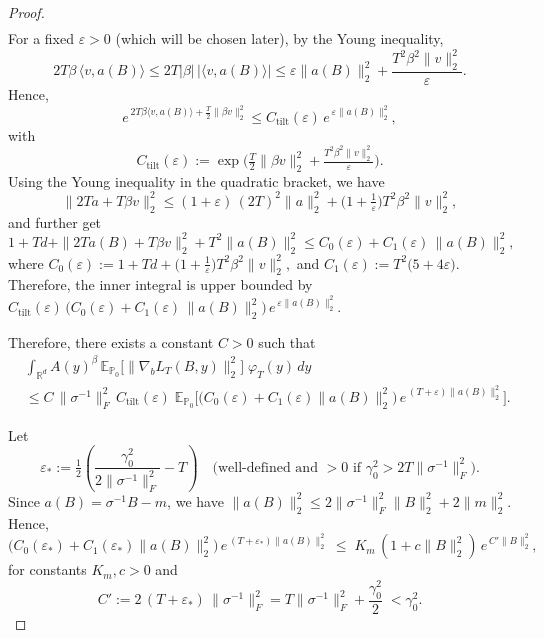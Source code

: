 \documentclass[10pt,a4paper]{amsart}
\newcommand{\E}{\mathbb{E}}
\newcommand{\R}{\mathbb{R}}
\begin{document}
\begin{proof}
\begin{align*}
\end{align*}
For a fixed $\varepsilon > 0$ (which will be chosen later), by the Young inequality, 
\[
2T\beta\,\langle v,a(B)\rangle
\leq
2T|\beta|\,|\langle v,a(B)\rangle|
\leq
\varepsilon\|a(B)\|_2^2
+
\frac{T^2\beta^2\|v\|_2^2}{\varepsilon}.
\]
Hence, 
\[
e^{\,2T\beta\langle v,a(B)\rangle+\frac{T}{2}\|\beta v\|_2^2}
\le C_{\mathrm{tilt}}(\varepsilon)\,e^{\,\varepsilon\|a(B)\|_2^2},
\]
with
\[
C_{\mathrm{tilt}}(\varepsilon):=\exp\!\Big(\tfrac{T}{2}\|\beta v\|_2^2+\tfrac{T^2\beta^2\|v\|_2^2}{\varepsilon}\Big).
\]
Using the Young inequality in the quadratic bracket, we have
\[
\|2Ta+T\beta v\|_2^2\le (1+\varepsilon)\,(2T)^2\|a\|_2^2+\Big(1+\tfrac1\varepsilon\Big)T^2\beta^2\|v\|_2^2,
\]
and further get
\[
1+Td+\|2Ta(B)+T\beta v\|_2^2+T^2\|a(B)\|_2^2
\le C_0(\varepsilon)+C_1(\varepsilon)\,\|a(B)\|_2^2,
\]where $C_0(\varepsilon):=1+Td+\Big(1+\tfrac{1}{\varepsilon}\Big)T^2\beta^2\|v\|_2^2,$ and $C_1(\varepsilon):=T^2\big(5+4\varepsilon\big).$
Therefore, the inner integral is upper bounded by
$C_{\mathrm{tilt}}(\varepsilon)\,\bigl(C_0(\varepsilon)+C_1(\varepsilon)\,\|a(B)\|_2^2\bigr)\,e^{\,\varepsilon\|a(B)\|_2^2}.$

Therefore, there exists a constant $C > 0$ such that
\begin{align*}
    &\int_{\R^d} A(y)^{\beta}\,\E_{\mathbb{P}_0}\big[\|\nabla_b L_T(B,y)\|_2^2\big]\;\varphi_T(y)\,dy \\
    &\leq C\,\|\sigma^{-1}\|_F^2\,C_{\mathrm{tilt}}(\varepsilon)\;
\E_{\mathbb{P}_0}\!\Big[\bigl(C_0(\varepsilon)+C_1(\varepsilon)\|a(B)\|_2^2\bigr)\,e^{\,(T+\varepsilon)\|a(B)\|_2^2}\Big].
\end{align*}

Let
\[
\varepsilon_*:=\tfrac12\!\left(\frac{\gamma_0^2}{2\|\sigma^{-1}\|_F^2}-T\right)
\quad\text{(well-defined and $>0$ if }\gamma_0^2>2T\|\sigma^{-1}\|_F^2).
\]
Since $a(B)=\sigma^{-1}B-m$, we have $\|a(B)\|_2^2\le 2\|\sigma^{-1}\|_F^2\|B\|_2^2+2\|m\|_2^2$. Hence, 
\begin{equation}\label{goal}
\bigl(C_0(\varepsilon_*)+C_1(\varepsilon_*)\|a(B)\|_2^2\bigr)\,e^{\,(T+\varepsilon_*)\|a(B)\|_2^2}
\;\le\;K_m\,(1+c\|B\|_2^2)\,e^{\,C'\|B\|_2^2},    
\end{equation}
for constants $K_m,c>0$ and
\[
C':=2\,(T+\varepsilon_*)\,\|\sigma^{-1}\|_F^2
= T\|\sigma^{-1}\|_F^2+\frac{\gamma_0^2}{2}\;<\gamma_0^2.
\]


\end{proof}
\end{document}
